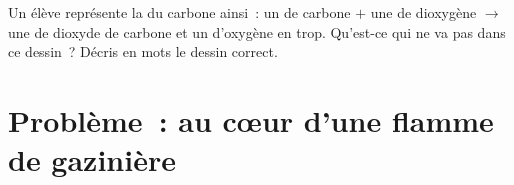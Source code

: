 \begin{exercise}[$\star\star\star$]\label{exo:g7:chemical-reactions:12}
Un élève représente la  du carbone ainsi~: un  de carbone
$+$ une  de dioxygène $\longrightarrow$ une  de dioxyde
de carbone et un  d'oxygène en trop. Qu'est-ce qui ne va pas dans
ce dessin~? Décris en mots le dessin correct.
\end{exercise}

\section{Problème~: au cœur d'une flamme de gazinière}

